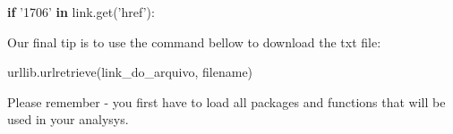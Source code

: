 \documentclass[11pt]{article}
\newenvironment{Shaded}{}{}
\newcommand{\KeywordTok}[1]{\textcolor[rgb]{0.00,0.44,0.13}{\textbf{{#1}}}}
\newcommand{\StringTok}[1]{\textcolor[rgb]{0.25,0.44,0.63}{{#1}}}
\newcommand{\NormalTok}[1]{{#1}}
\newcommand{\ControlFlowTok}[1]{\textcolor[rgb]{0.00,0.44,0.13}{\textbf{{#1}}}}
\begin{document}
\begin{Shaded}
\begin{Highlighting}[]
\ControlFlowTok{if} \StringTok{'1706'} \KeywordTok{in}\NormalTok{ link.get(}\StringTok{'href'}\NormalTok{):}
\end{Highlighting}
\end{Shaded}

Our final tip is to use the command bellow to download the txt file:

\begin{Shaded}
\begin{Highlighting}[]
\NormalTok{urllib.urlretrieve(link_do_arquivo, filename)}
\end{Highlighting}
\end{Shaded}

Please remember - you first have to load all packages and functions that
will be used in your analysys.
\end{document}
